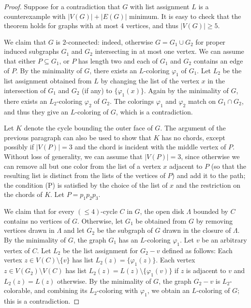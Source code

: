 \documentclass[12pt,twoside,openright,a4paper]{book}
\begin{document}
\begin{proof}
Suppose for a contradiction that $G$ with list assignment $L$ is a counterexample with $|V(G)|+|E(G)|$ minimum.
It is easy to check that the theorem holds for graphs with at most $4$ vertices, and thus $|V(G)|\ge 5$.

We claim that $G$ is $2$-connected: indeed, otherwise $G=G_1\cup G_2$ for proper induced subgraphs $G_1$ and $G_2$
intersecting in at most one vertex.  We can assume that either $P\subseteq G_1$, or $P$ has length two and each of $G_1$
and $G_2$ contains an edge of $P$.  By the minimality of $G$, there exists an $L$-coloring $\varphi_1$ of $G_1$.
Let $L_2$ be the list assignment obtained from $L$ by changing the list of the vertex $x$ in the intersection of $G_1$ and $G_2$
(if any) to $\{\varphi_1(x)\}$.  Again by the minimality of $G$, there exists an $L_2$-coloring $\varphi_2$ of $G_2$.
The colorings $\varphi_1$ and $\varphi_2$ match on $G_1\cap G_2$, and thus they give an $L$-coloring of $G$, which is a contradiction.

Let $K$ denote the cycle bounding the outer face of $G$.  The argument of the previous paragraph can also be used to show
that $K$ has no chords, except possibly if $|V(P)|=3$ and the chord is incident with the middle vertex of $P$.
Without loss of generality, we can assume that $|V(P)|=3$, since otherwise we can remove all but one color from the list of
a vertex $x$ adjacent to $P$ (so that the resulting list is distinct from the lists of the vertices of $P$) and add it to the path;
the condition (P) is satisfied by the choice of the list of $x$ and the restriction on the chords of $K$.
Let $P=p_1p_2p_3$.

We claim that for every $(\le\!4)$-cycle $C$ in $G$, the open disk $\Lambda$ bounded by $C$ contains no vertices of $G$.
Otherwise, let $G_1$ be obtained from $G$ by removing vertices drawn in $\Lambda$ and let $G_2$ be the subgraph of $G$ drawn
in the closure of $\Lambda$.  By the minimality of $G$, the graph $G_1$ has an $L$-coloring $\varphi_1$.
Let $v$ be an arbitrary vertex of $C$.  Let $L_2$ be the list assignment for $G_2-v$ defined as follows:
Each vertex $z\in V(C)\setminus \{v\}$ has list $L_2(z)=\{\varphi_1(z)\}$.  Each vertex $z\in V(G_2)\setminus V(C)$
has list $L_2(z)=L(z)\setminus \{\varphi_1(v)\}$ if $z$ is adjacent to $v$ and $L_2(z)=L(z)$ otherwise.
By the minimality of $G$, the graph $G_2-v$ is $L_2$-colorable, and combining its $L_2$-coloring with $\varphi_1$,
we obtain an $L$-coloring of $G$; this is a contradiction.


\end{proof}
\end{document}
